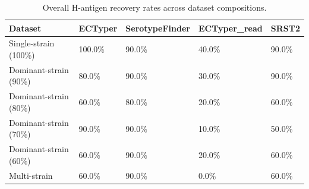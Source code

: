 \begin{table}[!ht]
\centering
\caption{Overall H-antigen recovery rates across dataset compositions.}
\label{tab:H_accuracy}

\begin{tabular}{lllll}
\toprule
Dataset & ECTyper & SerotypeFinder & ECTyper_read & SRST2\\
\midrule
Single-strain (100\%) & 100.0\% & 90.0\% & 40.0\% & 90.0\%\\
Dominant-strain (90\%) & 80.0\% & 90.0\% & 30.0\% & 90.0\%\\
Dominant-strain (80\%) & 60.0\% & 80.0\% & 20.0\% & 60.0\%\\
Dominant-strain (70\%) & 90.0\% & 90.0\% & 10.0\% & 50.0\%\\
Dominant-strain (60\%) & 60.0\% & 90.0\% & 20.0\% & 60.0\%\\
\addlinespace
Multi-strain & 60.0\% & 90.0\% & 0.0\% & 60.0\%\\
\bottomrule
\end{tabular}
\end{table}
